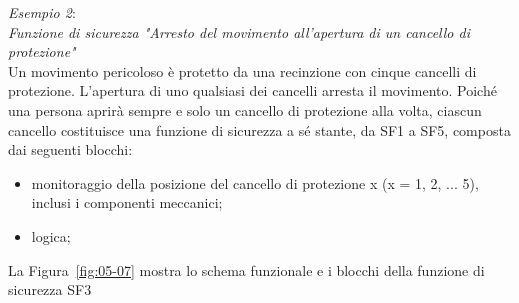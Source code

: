 \begin{center}
    \begin{minipage}{\textwidth}
        \centering
        \captionsetup{hypcap=false}
        \resizebox{0.92\textwidth}{!}{}
        \label{fig:05-06}
    \end{minipage}
\end{center}

\textit{Esempio 2}:\\
\textit{Funzione di sicurezza "Arresto del movimento all'apertura di un cancello di protezione"} \\
Un movimento pericoloso è protetto da una recinzione con cinque cancelli di protezione. L'apertura di uno qualsiasi dei cancelli arresta il movimento. Poiché una persona aprirà sempre e solo un cancello di protezione alla volta, ciascun cancello costituisce una funzione di sicurezza a sé stante, da SF1 a SF5, composta dai seguenti blocchi:
\begin{itemize}
    \item monitoraggio della posizione del cancello di protezione x (x = 1, 2, ... 5), inclusi i componenti meccanici;
    \item logica;
\end{itemize}
La Figura~\ref{fig:05-07} mostra lo schema funzionale e i blocchi della funzione di sicurezza SF3

\begin{center}
    \begin{minipage}{\textwidth}
        \centering
        \captionsetup{hypcap=false}
        \resizebox{0.92\textwidth}{!}{}
        \label{fig:05-07}
    \end{minipage}
\end{center}

